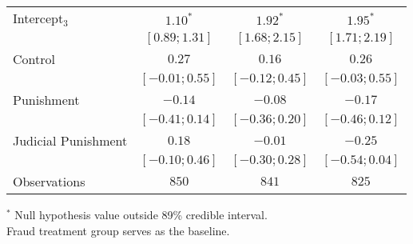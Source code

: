 \begin{table}[h]
\begin{center}
\begin{threeparttable}
\begin{tabular}{l c c c}
Intercept$_3$       & $1.10^{*}$        & $1.92^{*}$        & $1.95^{*}$        \\
                    & $ [ 0.89;  1.31]$ & $ [ 1.68;  2.15]$ & $ [ 1.71;  2.19]$ \\
Control             & $0.27$            & $0.16$            & $0.26$            \\
                    & $ [-0.01;  0.55]$ & $ [-0.12;  0.45]$ & $ [-0.03;  0.55]$ \\
Punishment          & $-0.14$           & $-0.08$           & $-0.17$           \\
                    & $ [-0.41;  0.14]$ & $ [-0.36;  0.20]$ & $ [-0.46;  0.12]$ \\
Judicial Punishment & $0.18$            & $-0.01$           & $-0.25$           \\
                    & $ [-0.10;  0.46]$ & $ [-0.30;  0.28]$ & $ [-0.54;  0.04]$ \\
\hline
Observations        & $850$             & $841$             & $825$             \\
\hline
\end{tabular}
\begin{tablenotes}[flushleft]
\scriptsize{$^*$ Null hypothesis value outside 89\% credible interval.  \\
Fraud treatment group serves as the baseline.}
\end{tablenotes}
\end{threeparttable}
\label{table:ol_main_la_npol_872}
\end{center}
\end{table}
